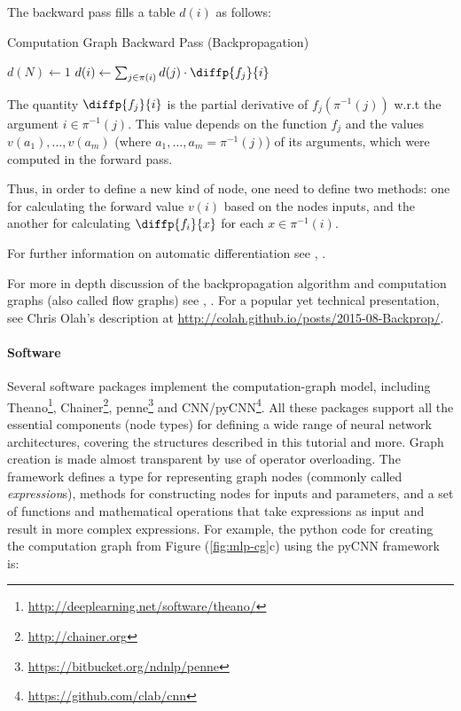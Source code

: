 \documentclass[jair,twoside,11pt,theapa]{article}
\newcommand{\ygcomment}[1]{\textbf{[TODO: #1]}}
\renewcommand{\ygcomment}[1]{}
\begin{document}
{\noindent The backward pass fills a table $d(i)$ as follows:
\begin{algorithm}[h]
    \caption{Computation Graph Backward Pass (Backpropagation)}
    \label{alg:forward}
\begin{algorithmic}[1]
    \State $d(N) \gets 1$
        \State $d(i) \gets \sum_{j \in\pi(i)} d(j) \cdot \diffp{f_j}{i}$
    \EndFor
\end{algorithmic}
\end{algorithm}

\noindent The quantity $\diffp{f_j}{i}$ is the partial derivative of
$f_j(\pi^{-1}(j))$ w.r.t the
argument $i \in \pi^{-1}(j)$.  This value depends on the function $f_j$ and the
values $v(a_1),\ldots,v(a_m)$ (where $a_1,\ldots,a_m = \pi^{-1}(j)$) of its arguments, which were computed in the forward pass.

Thus, in order to define a new kind of node, one need to define two methods: one
for calculating the forward value $v(i)$ based on the nodes inputs, and the
another for calculating $\diffp{f_i}{x}$ for each $x \in \pi^{-1}(i)$.

For further information on automatic differentiation see
\cite[Section 7]{neidinger2010introduction}, \cite{baydin2015automatic}.
\ygcomment{\cite{siam-book@@,others?}}
For more in depth discussion of the backpropagation algorithm and computation
graphs (also called flow graphs) see
\cite[Section 6.4]{bengio2015deep}, \cite{lecun1998gradient,bengio2012practical}.
For a popular yet technical presentation,
see Chris Olah's description at
\url{http://colah.github.io/posts/2015-08-Backprop/}.

\paragraph{Software} 
Several software packages implement the computation-graph model, including
Theano\footnote{\url{http://deeplearning.net/software/theano/}},
Chainer\footnote{\url{http://chainer.org}},
penne\footnote{\url{https://bitbucket.org/ndnlp/penne}} and
CNN/pyCNN\footnote{\url{https://github.com/clab/cnn}}.
All these packages support all the essential
components (node types) for defining a wide range of neural network
architectures, covering the structures described in this tutorial and more.
Graph creation is made almost transparent by use of operator overloading. The
framework defines a type for representing graph nodes (commonly called
\emph{expression}s), methods for constructing nodes for inputs and parameters,
and a set of functions and mathematical operations that take expressions as
input and result in more complex expressions. For example, the python code for
creating the computation graph from Figure (\ref{fig:mlp-cg}c) using the pyCNN
framework is:

}
\end{document}
